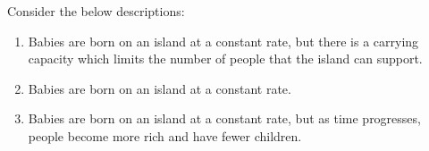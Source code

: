 \begin{enumerate}
Consider the below descriptions:
\begin{enumerate}
    \item Babies are born on an island at a constant rate, but there is a carrying capacity which limits the number of people that the island can support.
    \item Babies are born on an island at a constant rate.
    \item Babies are born on an island at a constant rate, but as time progresses, people become more rich and have fewer children.
\end{enumerate}





\end{enumerate}

